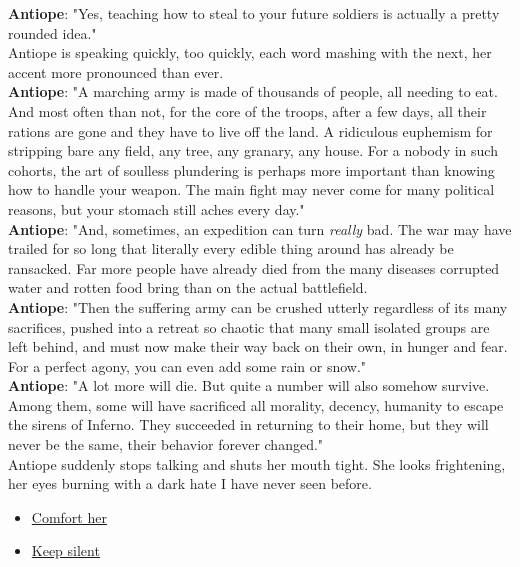 \documentclass{report}
\newcommand{\speaker}[1]{
	\textbf{#1}: 
}
\newcommand{\glink}[2]{
	\hyperref[#1]{#2}
}
\begin{document}
\speaker{Antiope} "Yes, teaching how to steal to your future soldiers is actually a pretty rounded idea."\\

Antiope is speaking quickly, too quickly, each word mashing with the next, her accent more pronounced than ever.\\

\speaker{Antiope} "A marching army is made of thousands of people, all needing to eat. And most often than not, for the core of the troops, after a few days, all their rations are gone and they have to live off the land. A ridiculous euphemism for stripping bare any field, any tree, any granary, any house. For a nobody in such cohorts, the art of soulless plundering is perhaps more important than knowing how to handle your weapon. The main fight may never come for many political reasons, but your stomach still aches every day."\\

\speaker{Antiope} "And, sometimes, an expedition can turn \emph{really} bad. The war may have trailed for so long that literally every edible thing around has already be ransacked. Far more people have already died from the many diseases corrupted water and rotten food bring than on the actual battlefield.\\

\speaker{Antiope} "Then the suffering army can be crushed utterly regardless of its many sacrifices, pushed into a retreat so chaotic that many small isolated groups are left behind, and must now make their way back on their own, in hunger and fear. For a perfect agony, you can even add some rain or snow."\\

\speaker{Antiope} "A lot more will die. But quite a number will also somehow survive. Among them, some will have sacrificed all morality, decency, humanity to escape the sirens of Inferno. They succeeded in returning to their home, but they will never be the same, their behavior forever changed."\\

Antiope suddenly stops talking and shuts her mouth tight. She looks frightening, her eyes burning with a dark hate I have never seen before.\\

\begin{itemize}
	\item \glink{Posttraumatic}{Comfort her}
	\item \glink{Fleeing the past}{Keep silent}
\end{itemize}
\end{document}

